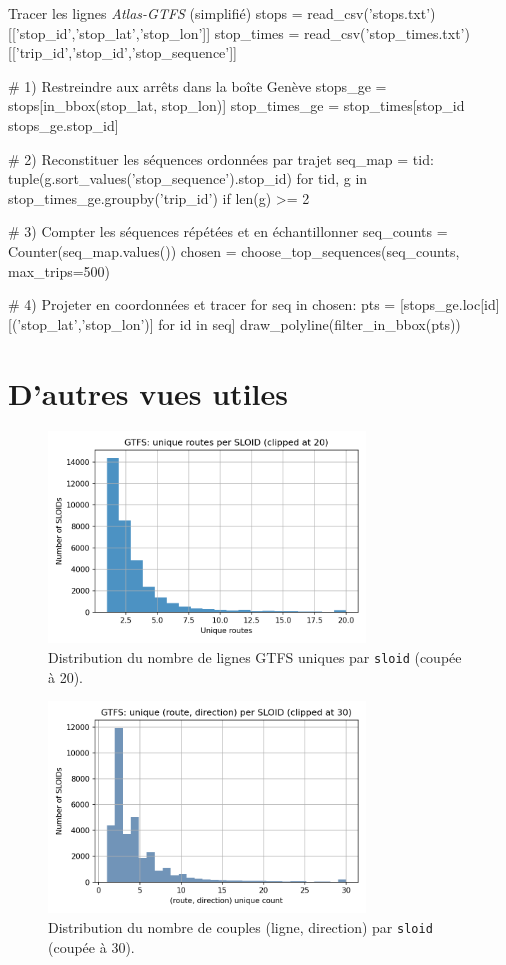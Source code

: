 \begin{codebox}[language=Python]{Tracer les lignes \emph{Atlas-GTFS} (simplifié)}
stops = read_csv('stops.txt')[['stop_id','stop_lat','stop_lon']]
stop_times = read_csv('stop_times.txt')[['trip_id','stop_id','stop_sequence']]

# 1) Restreindre aux arrêts dans la boîte Genève
stops_ge = stops[in_bbox(stop_lat, stop_lon)]
stop_times_ge = stop_times[stop_id \in stops_ge.stop_id]

# 2) Reconstituer les séquences ordonnées par trajet
seq_map = {tid: tuple(g.sort_values('stop_sequence').stop_id)
           for tid, g in stop_times_ge.groupby('trip_id') if len(g) >= 2}

# 3) Compter les séquences répétées et en échantillonner
seq_counts = Counter(seq_map.values())
chosen = choose_top_sequences(seq_counts, max_trips=500)

# 4) Projeter en coordonnées et tracer
for seq in chosen:
    pts = [stops_ge.loc[id][('stop_lat','stop_lon')] for id in seq]
    draw_polyline(filter_in_bbox(pts))
\end{codebox}

\section{D'autres vues utiles}
\begin{figure}[H]
  \centering
  \includegraphics[width=0.75\textwidth]{../figures/chap4/hist_gtfs_routes_per_sloid.png}
  \caption{Distribution du nombre de lignes GTFS uniques par \texttt{sloid} (coupée à 20).}
\end{figure}

\begin{figure}[H]
  \centering
  \includegraphics[width=0.75\textwidth]{../figures/chap4/hist_gtfs_route_dir_per_sloid.png}
  \caption{Distribution du nombre de couples (ligne, direction) par \texttt{sloid} (coupée à 30).}
\end{figure}

